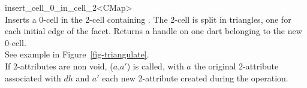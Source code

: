 \begin{ccRefFunction}{insert_cell_0_in_cell_2<CMap>}
\\

{Inserts a 0-cell in the 2-cell containing .
  The 2-cell is split in triangles, one for each initial edge of the facet.
  Returns a handle on one dart belonging to the new 0-cell.
 \\
  See example in Figure~\ref{fig-triangulate}.\\
    If 2-attributes are non void, 
    ($a$,$a'$) is called, with $a$ the original 2-attribute associated
    with $dh$ and $a'$ each new 2-attribute created during the operation.
}

\ccSeeAlso
{}\\
\\
\\
\\
\\
\end{ccRefFunction}
